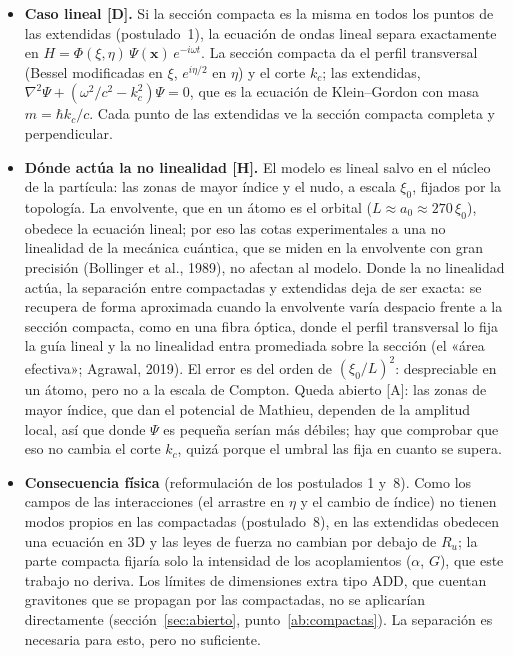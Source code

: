\documentclass[11pt,a4paper]{article}
\newcommand{\st}[1]{\textup{[#1]}}
\newcommand{\vb}[1]{\symbf{#1}}
\begin{document}
\begin{itemize}[leftmargin=*]
\item \textbf{Caso lineal \st{D}.} Si la sección compacta es la misma en todos los puntos de las extendidas (postulado~1), la ecuación de ondas lineal separa exactamente en $H=\Phi(\xi,\eta)\,\Psi(\vb{x})\,e^{-i\omega t}$. La sección compacta da el perfil transversal (Bessel modificadas en $\xi$, $e^{i\eta/2}$ en $\eta$) y el corte $k_c$; las extendidas, $\nabla^2\Psi+(\omega^2/c^2-k_c^2)\Psi=0$, que es la ecuación de Klein--Gordon con masa $m=\hbar k_c/c$. Cada punto de las extendidas ve la sección compacta completa y perpendicular.

\item \textbf{Dónde actúa la no linealidad \st{H}.} El modelo es lineal salvo en el núcleo de la partícula: las zonas de mayor índice y el nudo, a escala $\xi_0$, fijados por la topología. La envolvente, que en un átomo es el orbital ($L\approx a_0\approx270\,\xi_0$), obedece la ecuación lineal; por eso las cotas experimentales a una no linealidad de la mecánica cuántica, que se miden en la envolvente con gran precisión (Bollinger et al., 1989), no afectan al modelo. Donde la no linealidad actúa, la separación entre compactadas y extendidas deja de ser exacta: se recupera de forma aproximada cuando la envolvente varía despacio frente a la sección compacta, como en una fibra óptica, donde el perfil transversal lo fija la guía lineal y la no linealidad entra promediada sobre la sección (el «área efectiva»; Agrawal, 2019). El error es del orden de $(\xi_0/L)^2$: despreciable en un átomo, pero no a la escala de Compton. Queda abierto \st{A}: las zonas de mayor índice, que dan el potencial de Mathieu, dependen de la amplitud local, así que donde $\Psi$ es pequeña serían más débiles; hay que comprobar que eso no cambia el corte $k_c$, quizá porque el umbral las fija en cuanto se supera.

\item \textbf{Consecuencia física} (reformulación de los postulados 1 y~8). Como los campos de las interacciones (el arrastre en $\eta$ y el cambio de índice) no tienen modos propios en las compactadas (postulado~8), en las extendidas obedecen una ecuación en 3D y las leyes de fuerza no cambian por debajo de $R_u$; la parte compacta fijaría solo la intensidad de los acoplamientos ($\alpha$, $G$), que este trabajo no deriva. Los límites de dimensiones extra tipo ADD, que cuentan gravitones que se propagan por las compactadas, no se aplicarían directamente (sección~\ref{sec:abierto}, punto~\ref{ab:compactas}). La separación es necesaria para esto, pero no suficiente.
\end{itemize}
\end{document}
